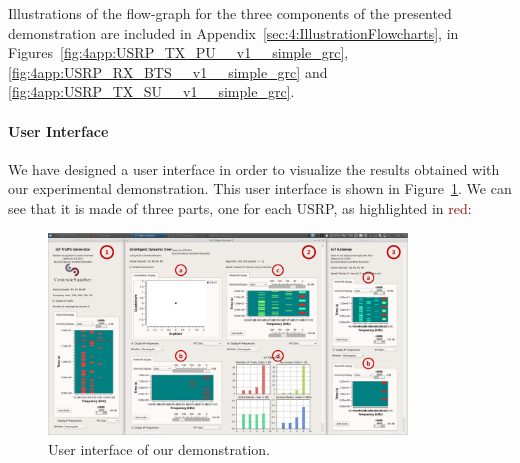 Illustrations of the flow-graph for the three components of the presented demonstration are included in Appendix~\ref{sec:4:IllustrationFlowcharts}, in Figures~\ref{fig:4app:USRP_TX_PU__v1__simple_grc}, \ref{fig:4app:USRP_RX_BTS__v1__simple_grc} and \ref{fig:4app:USRP_TX_SU__v1__simple_grc}.


\paragraph{User Interface}

We have designed a user interface in order to visualize the results obtained  with our experimental demonstration. This user interface is shown in Figure~\ref{fig:42:UI}.
We can see that it is made of three parts, one for each USRP, as highlighted in \textcolor{darkred}{red}:

\begin{figure}[!t]
    \centering
    \includegraphics[width=0.85\textwidth]{UI.eps}
    \caption{User interface of our demonstration.}
    \label{fig:42:UI}
\end{figure}


